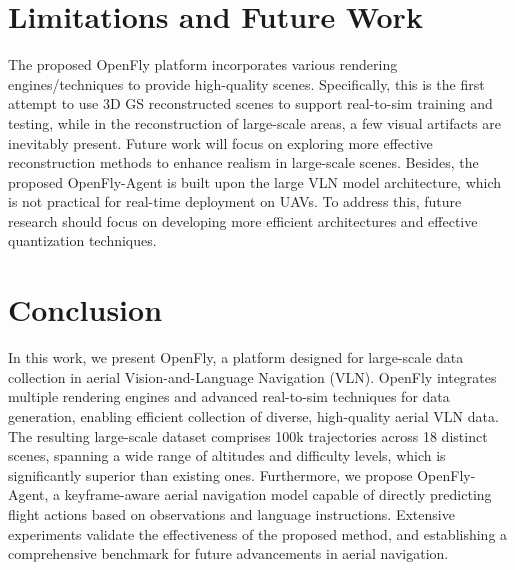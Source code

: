 \section{Limitations and Future Work}
The proposed OpenFly platform incorporates various rendering engines/techniques to provide high-quality scenes. Specifically, this is the first attempt to use 3D GS reconstructed scenes to support real-to-sim training and testing, while in the reconstruction of large-scale areas, a few visual artifacts are inevitably present. Future work will focus on exploring more effective reconstruction methods to enhance realism in large-scale scenes. Besides, the proposed OpenFly-Agent is built upon the large VLN model architecture, which is not practical for real-time deployment on UAVs. To address this, future research should focus on developing more efficient architectures and effective quantization techniques. 


\section{Conclusion}
In this work, we present OpenFly, a platform designed for large-scale data collection in aerial Vision-and-Language Navigation (VLN). OpenFly integrates multiple rendering engines and advanced real-to-sim techniques for data generation, enabling efficient collection of diverse, high-quality aerial VLN data. The resulting large-scale dataset comprises 100k trajectories across 18 distinct scenes, spanning a wide range of altitudes and difficulty levels, which is significantly superior than existing ones. Furthermore, we propose OpenFly-Agent, a keyframe-aware aerial navigation model capable of directly predicting flight actions based on observations and language instructions. Extensive experiments validate the effectiveness of the proposed method, and establishing a comprehensive benchmark for future advancements in aerial navigation. 
